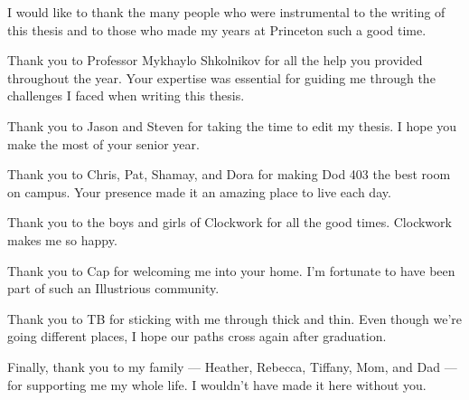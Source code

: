 I would like to thank the many people who were instrumental to the writing of this thesis and to those who made my years at Princeton such a good time.
\newline

Thank you to Professor Mykhaylo Shkolnikov for all the help you provided throughout the year. Your expertise was essential for guiding me through the challenges I faced when writing this thesis.
\newline

Thank you to Jason and Steven for taking the time to edit my thesis. I hope you make the most of your senior year.
\newline

Thank you to Chris, Pat, Shamay, and Dora for making Dod 403 the best room on campus. Your presence made it an amazing place to live each day.
\newline

Thank you to the boys and girls of Clockwork for all the good times. Clockwork makes me so happy.
\newline

Thank you to Cap for welcoming me into your home. I'm fortunate to have been part of such an Illustrious community.
\newline

Thank you to TB for sticking with me through thick and thin. Even though we're going different places, I hope our paths cross again after graduation.
\newline

Finally, thank you to my family --- Heather, Rebecca, Tiffany, Mom, and Dad --- for supporting me my whole life. I wouldn't have made it here without you.




